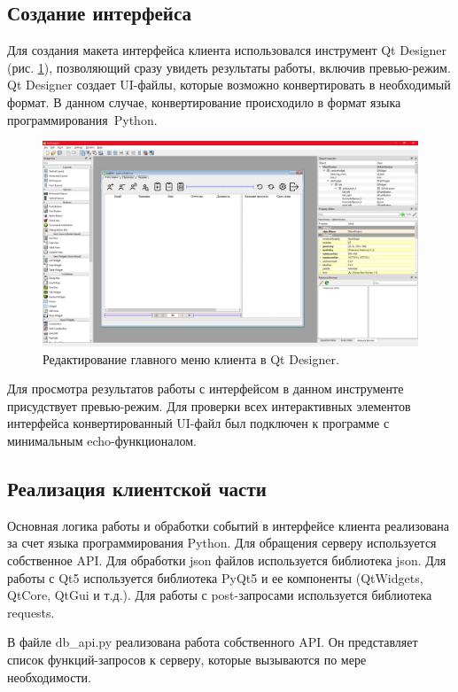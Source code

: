 \subsection{Создание интерфейса}
Для создания макета интерфейса клиента использовался инструмент Qt Designer (рис. \ref{fig:qtdesigner}),
позволяющий сразу увидеть результаты работы, включив превью-режим. Qt Designer создает UI-файлы, которые возможно конвертировать в необходимый формат.
В данном случае, конвертирование происходило в формат языка программирования Python.
\begin{figure}[h]
    \centering
    \includegraphics[width=1\linewidth]{img/qtdesigner.png}
    \caption{Редактирование главного меню клиента в Qt Designer.}
    \label{fig:qtdesigner}
\end{figure}

Для просмотра результатов работы с интерфейсом в данном инструменте присудствует превью-режим.
Для проверки всех интерактивных элементов интерфейса конвертированный UI-файл был подключен к программе с минимальным echo-функционалом.


\clearpage
\subsection{Реализация клиентской части}
Основная логика работы и обработки событий в интерфейсе клиента реализована за счет языка программирования Python.
Для обращения серверу используется собственное API. Для обработки json файлов используется библиотека json.
Для работы с Qt5 используется библиотека PyQt5 и ее компоненты (QtWidgets, QtCore, QtGui и т.д.).
Для работы с post-запросами используется библиотека requests.

В файле db\_api.py реализована работа собственного API. Он представляет список функций-запросов к серверу, которые вызываются по мере необходимости.

